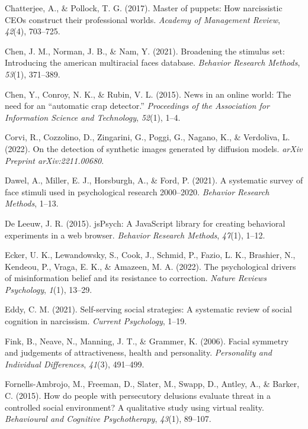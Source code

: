 \documentclass[
  man,
  floatsintext,
  longtable,
  nolmodern,
  notxfonts,
  notimes,
  colorlinks=true,linkcolor=blue,citecolor=blue,urlcolor=blue]{apa7}
\newlength{\cslhangindent}
\newenvironment{CSLReferences}[2] %
 {\begin{list}{}{%
  \setlength{\itemindent}{0pt}
  \setlength{\leftmargin}{0pt}
  \setlength{\parsep}{0pt}
  \ifodd #1
   \setlength{\leftmargin}{\cslhangindent}
   \setlength{\itemindent}{-1\cslhangindent}
  \fi
  \setlength{\itemsep}{#2\baselineskip}}}
 {\end{list}}
\begin{document}
\begin{CSLReferences}{1}{0}
Chatterjee, A., \& Pollock, T. G. (2017). Master of puppets: How
narcissistic CEOs construct their professional worlds. \emph{Academy of
Management Review}, \emph{42}(4), 703--725.

Chen, J. M., Norman, J. B., \& Nam, Y. (2021). Broadening the stimulus
set: Introducing the american multiracial faces database. \emph{Behavior
Research Methods}, \emph{53}(1), 371--389.

Chen, Y., Conroy, N. K., \& Rubin, V. L. (2015). News in an online
world: The need for an {``automatic crap detector.''} \emph{Proceedings
of the Association for Information Science and Technology},
\emph{52}(1), 1--4.

Corvi, R., Cozzolino, D., Zingarini, G., Poggi, G., Nagano, K., \&
Verdoliva, L. (2022). On the detection of synthetic images generated by
diffusion models. \emph{arXiv Preprint arXiv:2211.00680}.

Dawel, A., Miller, E. J., Horsburgh, A., \& Ford, P. (2021). A
systematic survey of face stimuli used in psychological research
2000--2020. \emph{Behavior Research Methods}, 1--13.

De Leeuw, J. R. (2015). jsPsych: A JavaScript library for creating
behavioral experiments in a web browser. \emph{Behavior Research
Methods}, \emph{47}(1), 1--12.

Ecker, U. K., Lewandowsky, S., Cook, J., Schmid, P., Fazio, L. K.,
Brashier, N., Kendeou, P., Vraga, E. K., \& Amazeen, M. A. (2022). The
psychological drivers of misinformation belief and its resistance to
correction. \emph{Nature Reviews Psychology}, \emph{1}(1), 13--29.

Eddy, C. M. (2021). Self-serving social strategies: A systematic review
of social cognition in narcissism. \emph{Current Psychology}, 1--19.

Fink, B., Neave, N., Manning, J. T., \& Grammer, K. (2006). Facial
symmetry and judgements of attractiveness, health and personality.
\emph{Personality and Individual Differences}, \emph{41}(3), 491--499.

Fornells-Ambrojo, M., Freeman, D., Slater, M., Swapp, D., Antley, A., \&
Barker, C. (2015). How do people with persecutory delusions evaluate
threat in a controlled social environment? A qualitative study using
virtual reality. \emph{Behavioural and Cognitive Psychotherapy},
\emph{43}(1), 89--107.


\end{CSLReferences}
\end{document}
